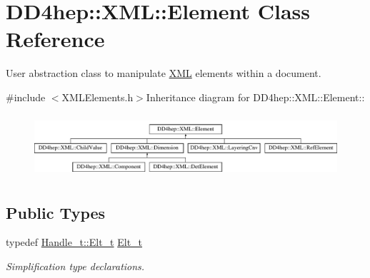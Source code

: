 \hypertarget{class_d_d4hep_1_1_x_m_l_1_1_element}{
\section{DD4hep::XML::Element Class Reference}
\label{class_d_d4hep_1_1_x_m_l_1_1_element}
}


User abstraction class to manipulate \hyperlink{namespace_d_d4hep_1_1_x_m_l}{XML} elements within a document.  


{\ttfamily \#include $<$XMLElements.h$>$}Inheritance diagram for DD4hep::XML::Element::\begin{figure}[H]
\begin{center}
\leavevmode
\includegraphics[height=2.35955cm]{class_d_d4hep_1_1_x_m_l_1_1_element}
\end{center}
\end{figure}
\subsection*{Public Types}
\begin{DoxyCompactItemize}
\item 
typedef \hyperlink{class_d_d4hep_1_1_x_m_l_1_1_handle__t_a81a72155f29971b37652430a334a6b30}{Handle\_\-t::Elt\_\-t} \hyperlink{class_d_d4hep_1_1_x_m_l_1_1_element_af63782f6873c3d8c9b28e1777cde9275}{Elt\_\-t}
\begin{DoxyCompactList}\small\item\em Simplification type declarations. \item\end{DoxyCompactList}\end{DoxyCompactItemize}
